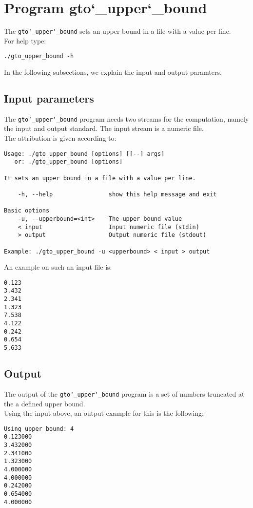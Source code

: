 \section{Program gto\char`_upper\char`_bound}
The \texttt{gto\char`_upper\char`_bound} sets an upper bound in a file with a value per line.\\
For help type:
\begin{lstlisting}
./gto_upper_bound -h
\end{lstlisting}
In the following subsections, we explain the input and output paramters.

\subsection*{Input parameters}

The \texttt{gto\char`_upper\char`_bound} program needs two streams for the computation, namely the input and output standard. The input stream is a numeric file.\\
The attribution is given according to:
\begin{lstlisting}
Usage: ./gto_upper_bound [options] [[--] args]
   or: ./gto_upper_bound [options]

It sets an upper bound in a file with a value per line.

    -h, --help                show this help message and exit

Basic options
    -u, --upperbound=<int>    The upper bound value
    < input                   Input numeric file (stdin)
    > output                  Output numeric file (stdout)

Example: ./gto_upper_bound -u <upperbound> < input > output
\end{lstlisting}
An example on such an input file is:
\begin{lstlisting}
0.123
3.432
2.341
1.323
7.538
4.122
0.242
0.654
5.633
\end{lstlisting}

\subsection*{Output}
The output of the \texttt{gto\char`_upper\char`_bound} program is a set of numbers truncated at the a defined upper bound.\\
Using the input above, an output example for this is the following:
\begin{lstlisting}
Using upper bound: 4
0.123000
3.432000
2.341000
1.323000
4.000000
4.000000
0.242000
0.654000
4.000000
\end{lstlisting}
